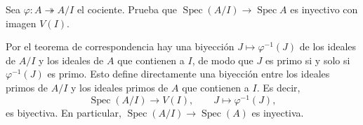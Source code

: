 \begin{ejer}
Sea $\varphi\colon A\twoheadrightarrow A/I$ el cociente. Prueba que $\operatorname{Spec}(A/I)\to\operatorname{Spec}A$ es inyectivo con imagen $V(I)$.
\end{ejer}
\begin{sol}
Por el teorema de correspondencia hay una biyección $J\mapsto\varphi^{-1}(J)$ de los ideales de $A/I$ y los ideales de $A$ que contienen a $I$, de modo que $J$ es primo si y solo si $\varphi^{-1}(J)$ es primo. Esto define directamente una biyección entre los ideales primos de $A/I$ y los ideales primos de $A$ que contienen a $I$. Es decir,
\[
\operatorname{Spec}(A/I)\longrightarrow V(I),
\qquad J\longmapsto\varphi^{-1}(J),
\]
es biyectiva. En particular, $\operatorname{Spec}(A/I)\to\operatorname{Spec}(A)$ es inyectiva.
\end{sol}